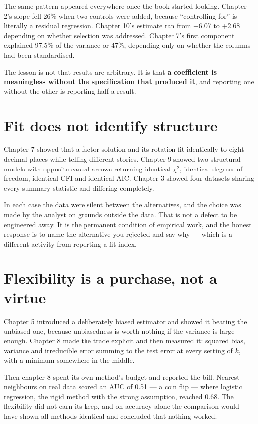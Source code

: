 \documentclass[
  letterpaper,
  10pt,
  twoside,
  openright,
  numbers=noenddot,
  chapterprefix=true]{scrbook}
\begin{document}
The same pattern appeared everywhere once the book started looking.
Chapter 2's slope fell 26\% when two controls were added, because
``controlling for'' is literally a residual regression. Chapter 10's
estimate ran from +6.07 to +2.68 depending on whether selection was
addressed. Chapter 7's first component explained 97.5\% of the variance
or 47\%, depending only on whether the columns had been standardised.

The lesson is not that results are arbitrary. It is that \textbf{a
coefficient is meaningless without the specification that produced it},
and reporting one without the other is reporting half a result.

\section{Fit does not identify
structure}\label{fit-does-not-identify-structure}

Chapter 7 showed that a factor solution and its rotation fit identically
to eight decimal places while telling different stories. Chapter 9
showed two structural models with opposite causal arrows returning
identical \(\chi^2\), identical degrees of freedom, identical CFI and
identical AIC. Chapter 3 showed four datasets sharing every summary
statistic and differing completely.

In each case the data were silent between the alternatives, and the
choice was made by the analyst on grounds outside the data. That is not
a defect to be engineered away. It is the permanent condition of
empirical work, and the honest response is to name the alternative you
rejected and say why --- which is a different activity from reporting a
fit index.

\section{Flexibility is a purchase, not a
virtue}\label{flexibility-is-a-purchase-not-a-virtue}

Chapter 5 introduced a deliberately biased estimator and showed it
beating the unbiased one, because unbiasedness is worth nothing if the
variance is large enough. Chapter 8 made the trade explicit and then
measured it: squared bias, variance and irreducible error summing to the
test error at every setting of \(k\), with a minimum somewhere in the
middle.

Then chapter 8 spent its own method's budget and reported the bill.
Nearest neighbours on real data scored an AUC of 0.51 --- a coin flip
--- where logistic regression, the rigid method with the strong
assumption, reached 0.68. The flexibility did not earn its keep, and on
accuracy alone the comparison would have shown all methods identical and
concluded that nothing worked.
\end{document}
